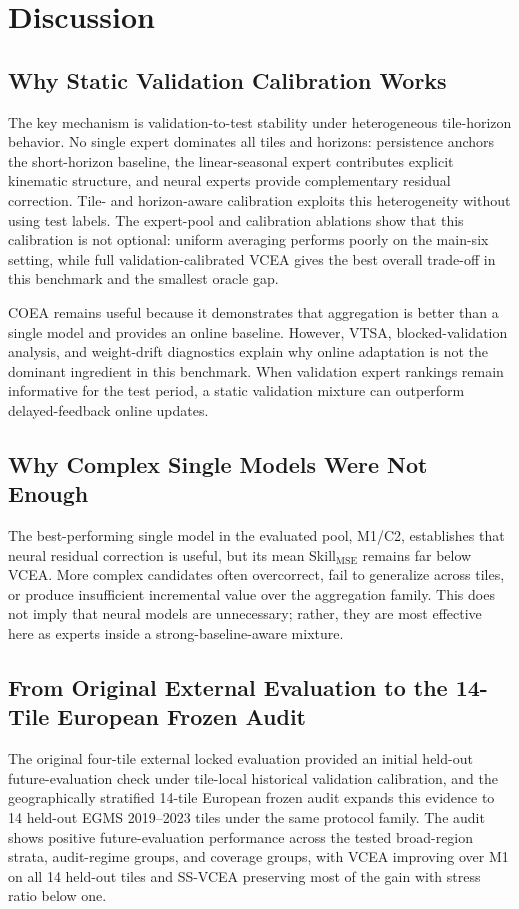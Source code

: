 \documentclass[lettersize,journal]{IEEEtran}
\newcommand{\skillmse}{Skill$_{\mathrm{MSE}}$}
\begin{document}
\section{Discussion}
\subsection{Why Static Validation Calibration Works}
The key mechanism is validation-to-test stability under heterogeneous tile-horizon behavior. No single expert dominates all tiles and horizons: persistence anchors the short-horizon baseline, the linear-seasonal expert contributes explicit kinematic structure, and neural experts provide complementary residual correction. Tile- and horizon-aware calibration exploits this heterogeneity without using test labels. The expert-pool and calibration ablations show that this calibration is not optional: uniform averaging performs poorly on the main-six setting, while full validation-calibrated VCEA gives the best overall trade-off in this benchmark and the smallest oracle gap.

COEA remains useful because it demonstrates that aggregation is better than a single model and provides an online baseline. However, VTSA, blocked-validation analysis, and weight-drift diagnostics explain why online adaptation is not the dominant ingredient in this benchmark. When validation expert rankings remain informative for the test period, a static validation mixture can outperform delayed-feedback online updates.

\subsection{Why Complex Single Models Were Not Enough}
The best-performing single model in the evaluated pool, M1/C2, establishes that neural residual correction is useful, but its mean \skillmse{} remains far below VCEA. More complex candidates often overcorrect, fail to generalize across tiles, or produce insufficient incremental value over the aggregation family. This does not imply that neural models are unnecessary; rather, they are most effective here as experts inside a strong-baseline-aware mixture.

\subsection{From Original External Evaluation to the 14-Tile European Frozen Audit}
The original four-tile external locked evaluation provided an initial held-out future-evaluation check under tile-local historical validation calibration, and the geographically stratified 14-tile European frozen audit expands this evidence to 14 held-out EGMS 2019--2023 tiles under the same protocol family. The audit shows positive future-evaluation performance across the tested broad-region strata, audit-regime groups, and coverage groups, with VCEA improving over M1 on all 14 held-out tiles and SS-VCEA preserving most of the gain with stress ratio below one.
\end{document}
